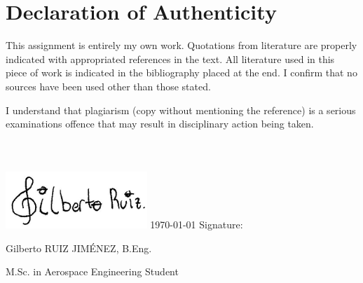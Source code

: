 \section*{Declaration of Authenticity}
This assignment is entirely my own work. Quotations from literature are properly indicated with appropriated references in the text. All literature used in this piece of work is indicated in the bibliography placed at the end. I confirm that no sources have been used other than those stated. \par 
I understand that plagiarism (copy without mentioning the reference) is a serious examinations offence that may result in disciplinary action being taken.
\\
\\
\\
\\

\includegraphics[width=0.4\textwidth, center]{images/Firma.png}\vspace{-0.8cm}
\today \hspace{6 pt} Signature: \hrulefill

\hspace*{0mm}\phantom{\today  Signature: }Gilberto RUIZ JIMÉNEZ, B.Eng.

\hspace*{0mm}\phantom{\today  Signature: }M.Sc. in Aerospace Engineering Student
